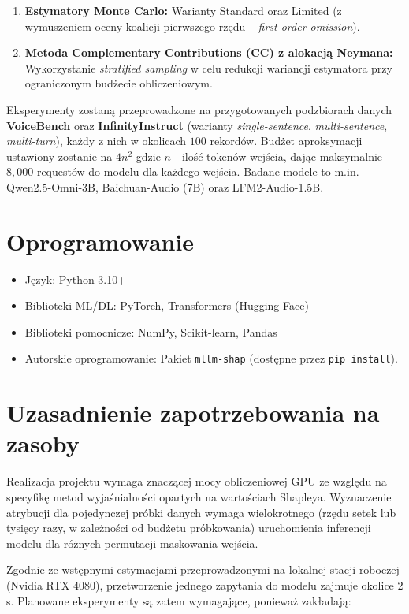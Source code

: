 \documentclass[a4paper,11pt]{article}
\begin{document}
\begin{enumerate} \item \textbf{Estymatory Monte Carlo:} Warianty Standard oraz Limited (z wymuszeniem oceny koalicji pierwszego rzędu -- \textit{first-order omission}). \item \textbf{Metoda Complementary Contributions (CC) z alokacją Neymana:} Wykorzystanie \textit{stratified sampling} w celu redukcji wariancji estymatora przy ograniczonym budżecie obliczeniowym. \end{enumerate}

\noindent Eksperymenty zostaną przeprowadzone na przygotowanych podzbiorach danych \textbf{VoiceBench} oraz \textbf{InfinityInstruct} (warianty \textit{single-sentence}, \textit{multi-sentence}, \textit{multi-turn}), każdy z nich w okolicach $100$ rekordów. Budżet aproksymacji ustawiony zostanie na $4 n^2$ gdzie $n$ - ilość tokenów wejścia, dając maksymalnie $8,000$ requestów do modelu dla każdego wejścia. Badane modele to m.in. Qwen2.5-Omni-3B, Baichuan-Audio (7B) oraz LFM2-Audio-1.5B.

\section*{Oprogramowanie}

\begin{itemize} \item Język: Python 3.10+ \item Biblioteki ML/DL: PyTorch, Transformers (Hugging Face) \item Biblioteki pomocnicze: NumPy, Scikit-learn, Pandas \item Autorskie oprogramowanie: Pakiet \texttt{mllm-shap} (dostępne przez \texttt{pip install}). \end{itemize}

\section*{Uzasadnienie zapotrzebowania na zasoby}

Realizacja projektu wymaga znaczącej mocy obliczeniowej GPU ze względu na specyfikę metod wyjaśnialności opartych na wartościach Shapleya. Wyznaczenie atrybucji dla pojedynczej próbki danych wymaga wielokrotnego (rzędu setek lub tysięcy razy, w zależności od budżetu próbkowania) uruchomienia inferencji modelu dla różnych permutacji maskowania wejścia.

Zgodnie ze wstępnymi estymacjami przeprowadzonymi na lokalnej stacji roboczej (Nvidia RTX 4080), przetworzenie jednego zapytania do modelu zajmuje okolice $2$ s. Planowane eksperymenty są zatem wymagające, ponieważ zakładają:
\end{document}
